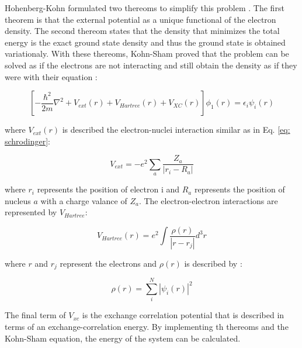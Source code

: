 Hohenberg-Kohn formulated two thereoms to simplify this problem \cite{Hohenberg1964}. The first theorem is that the external potential as a unique functional of the electron density. The second thereom states that the density that minimizes the total energy is the exact ground state density and thus the ground state is obtained variationaly. With these thereoms, Kohn-Sham proved that the problem can be solved as if the electrons are not interacting and still obtain the density as if they were with their equation \cite{Kohn1965}:
 
  \begin{equation}
 \label{eq: kohnsham}
\left[ -\frac{\hbar^2}{2m} \nabla^{2} + V_{ext} (r) + V_{Hartree}(r) + V_{XC} (r) \right] \phi_{1}(r) = \epsilon_{i} \psi_{i}(r)
 \end{equation}
 
 \noindent where $V_{ext}(r)$ is described the electron-nuclei interaction similar as in Eq. \ref{eq: schrodinger}:

\begin{equation}
\label{eq: vext}
V_{ext} = - e^2 \sum_{a} \frac {Z_{a}}{|r_i - R_a|}
\end{equation}

\noindent where $r_i$ represents the position of electron i and $R_a$ represents the position of nucleus $a$ with a charge valance of $Z_a$. The electron-electron interactions are represented by $V_{Hartree}$:

\begin{equation}
\label{eq: vhartree}
V_{Hartree} (r) = e^{2} \int \frac {\rho(r)}{|r - r_{j}|} d^3r
\end{equation}

\noindent where $r$ and $r_j$ represent the electrons and $\rho (r)$ is described by :

\begin{equation}
\label{eq: rhop}
\rho (r) = \sum_{i}^N | \psi_{i} (r) |^2
\end{equation}

\noindent The final term of $V_{xc}$ is the exchange correlation potential that is described in terms of an exchange-correlation energy. By implementing th thereoms and the Kohn-Sham equation, the energy of the system can be calculated. 

